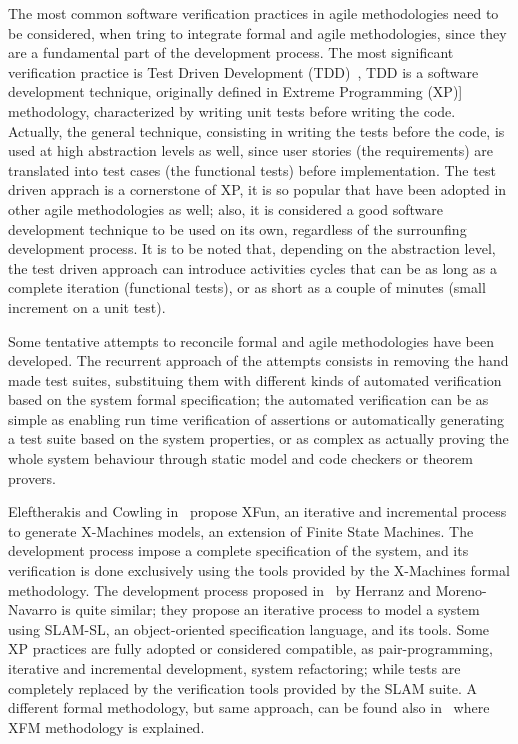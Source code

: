 \documentclass{article}
\begin{document}
The most common software verification practices in agile methodologies need to be considered, when tring to integrate formal and agile methodologies, since they are a fundamental part of the development process. 
The most significant verification practice is Test Driven Development (TDD)~\cite{Beck2003}, TDD is a software development technique, originally defined in Extreme Programming (XP)]\cite{Beck2004} methodology, characterized by writing unit tests before writing the code.
Actually, the general technique, consisting in writing the tests before the code, is used at high abstraction levels as well, since user stories (the requirements) are translated into test cases (the functional tests) before implementation.
The test driven apprach is a cornerstone of XP, it is so popular that have been adopted in other agile methodologies as well; also, it is considered a good software development technique to be used on its own, regardless of the surrounfing development process.
It is to be noted that, depending on the abstraction level, the test driven approach can introduce activities cycles that can be as long as a complete iteration (functional tests), or as short as a couple of minutes (small increment on a unit test).

Some tentative attempts to reconcile formal and agile methodologies have been developed.
The recurrent approach of the attempts consists in removing the hand made test suites, substituing them with different kinds of automated verification based on the system formal specification; the automated verification can be as simple as enabling run time verification of assertions or automatically generating a test suite based on the system properties, or as complex as actually proving the whole system behaviour through static model and code checkers or theorem provers.

Eleftherakis and Cowling in~\cite{Eleftherakis2003} propose XFun, an iterative and incremental process to generate X-Machines models, an extension of Finite State Machines. 
The development process impose a complete specification of the system, and its verification is done exclusively using the tools provided by the X-Machines formal methodology. 
The development process proposed in~\cite{Herranz2003b} by Herranz and Moreno-Navarro is quite similar; they propose an iterative process to model a system using SLAM-SL, an object-oriented specification language, and its tools. 
Some XP practices are fully adopted or considered compatible, as pair-programming, iterative and incremental development, system refactoring; while tests are completely replaced by the verification tools provided by the SLAM suite.
A different formal methodology, but same approach, can be found also in~\cite{Suhaib2005} where XFM methodology is explained.
\end{document}
